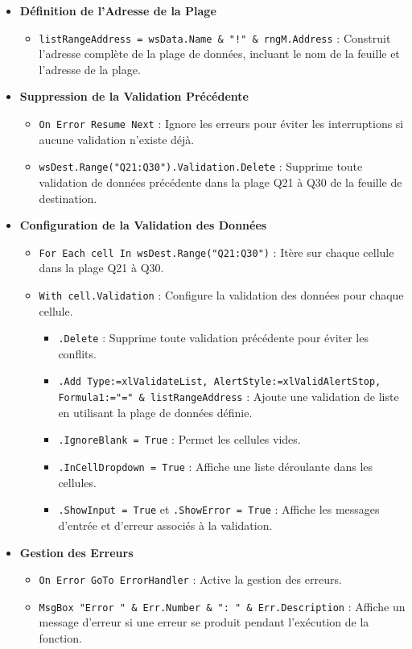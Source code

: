 \documentclass[a4paper, oneside, 12pt, final]{extreport}
\begin{document}
\begin{itemize}
    \item \textbf{Définition de l'Adresse de la Plage}
    \begin{itemize}
        \item \texttt{listRangeAddress = wsData.Name \& "!" \& rngM.Address} : Construit l'adresse complète de la plage de données, incluant le nom de la feuille et l'adresse de la plage.
    \end{itemize}

    \item \textbf{Suppression de la Validation Précédente}
    \begin{itemize}
        \item \texttt{On Error Resume Next} : Ignore les erreurs pour éviter les interruptions si aucune validation n'existe déjà.
        \item \texttt{wsDest.Range("Q21:Q30").Validation.Delete} : Supprime toute validation de données précédente dans la plage Q21 à Q30 de la feuille de destination.
    \end{itemize}

    \item \textbf{Configuration de la Validation des Données}
    \begin{itemize}
        \item \texttt{For Each cell In wsDest.Range("Q21:Q30")} : Itère sur chaque cellule dans la plage Q21 à Q30.
        \item \texttt{With cell.Validation} : Configure la validation des données pour chaque cellule.
        \begin{itemize}
            \item \texttt{.Delete} : Supprime toute validation précédente pour éviter les conflits.
            \item \texttt{.Add Type:=xlValidateList, AlertStyle:=xlValidAlertStop, Formula1:="=" \& listRangeAddress} : Ajoute une validation de liste en utilisant la plage de données définie.
            \item \texttt{.IgnoreBlank = True} : Permet les cellules vides.
            \item \texttt{.InCellDropdown = True} : Affiche une liste déroulante dans les cellules.
            \item \texttt{.ShowInput = True} et \texttt{.ShowError = True} : Affiche les messages d'entrée et d'erreur associés à la validation.
        \end{itemize}
    \end{itemize}

    \item \textbf{Gestion des Erreurs}
    \begin{itemize}
        \item \texttt{On Error GoTo ErrorHandler} : Active la gestion des erreurs.
        \item \texttt{MsgBox "Error " \& Err.Number \& ": " \& Err.Description} : Affiche un message d'erreur si une erreur se produit pendant l'exécution de la fonction.
    \end{itemize}
\end{itemize}
\end{document}
